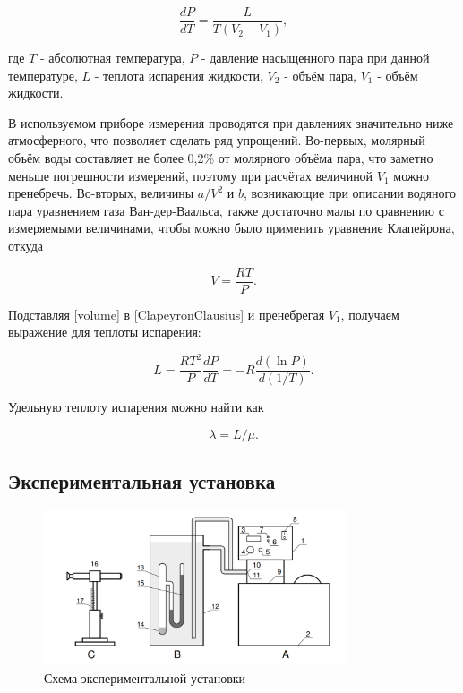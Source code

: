 \documentclass[a4paper,12pt]{article} %
\begin{document}
\begin{equation}
    \frac{dP}{dT} = \frac{L}{T(V_2 - V_1)},
    \label{ClapeyronClausius}
\end{equation}

где $T$ - абсолютная температура, $P$ - давление насыщенного пара при данной температуре, $L$ - теплота испарения жидкости, $V_2$ - объём пара, $V_1$ - объём жидкости. 

В используемом приборе измерения проводятся при давлениях значительно ниже атмосферного, что позволяет сделать ряд упрощений. Во-первых, молярный объём воды составляет не более 0,2\% от молярного объёма пара, что заметно меньше погрешности измерений, поэтому при расчётах величиной $V_1$ можно пренебречь. Во-вторых, величины $a/V^2$ и $b$, возникающие при описании водяного пара уравнением газа Ван-дер-Ваальса, также достаточно малы по сравнению с измеряемыми величинами, чтобы можно было применить уравнение Клапейрона, откуда

\begin{equation}
    V = \frac{RT}{P}.
    \label{volume}
\end{equation}

Подставляя \eqref{volume} в \eqref{ClapeyronClausius} и пренебрегая $V_1$, получаем выражение для теплоты испарения:

\begin{equation}
    L = \frac{RT^2}{P}\frac{dP}{dT} = -R\frac{d(\ln P)}{d(1/T)}.
    \label{finalEq}
\end{equation}

Удельную теплоту испарения можно найти как 

\begin{equation}
    \lambda = L/\mu.
    \label{final2}
\end{equation}

\subsection{Экспериментальная установка}

\begin{figure}
    \centering
    \includegraphics[width = 0.8\textwidth]{setup.PNG}
    \caption{Схема экспериментальной установки}
    \label{fig:setup}
\end{figure}
\end{document}
